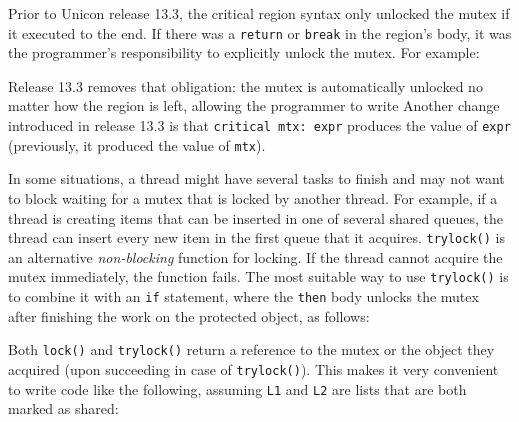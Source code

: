 Prior to Unicon release 13.3,
the critical region syntax only unlocked the mutex if it executed to the end. If
there was a \texttt{return} or \texttt{break} in the region's body, it was the
programmer's responsibility to explicitly unlock the mutex.  For example:

\noindent
Release 13.3 removes that obligation: the mutex is automatically unlocked no
matter how the region is left, allowing the programmer to write
\noindent
Another change introduced in release 13.3 is that \texttt{critical mtx: expr}
produces the value of \texttt{expr} (previously, it produced the value of
\texttt{mtx}).

\bigskip
In some situations, a thread might have several tasks to finish and may not want
to block waiting for a mutex that is locked by another thread. For example, if a
thread is creating items that can be inserted in one of several shared queues,
the thread can insert every new item in the first queue that it
acquires. \texttt{trylock()} is an alternative \emph{non-blocking} function for
locking. If the thread cannot acquire the mutex immediately, the function
fails. The most suitable way to use \texttt{trylock()} is to combine it with an
\texttt{if} statement, where the \texttt{then} body unlocks the mutex after
finishing the work on the protected object, as follows:


Both \texttt{lock()} and \texttt{trylock()} return a reference to the mutex or
the object they acquired (upon succeeding in case of \texttt{trylock()}). This
makes it very convenient to write code like the following, assuming \texttt{L1}
and \texttt{L2} are lists that are both marked as shared:


